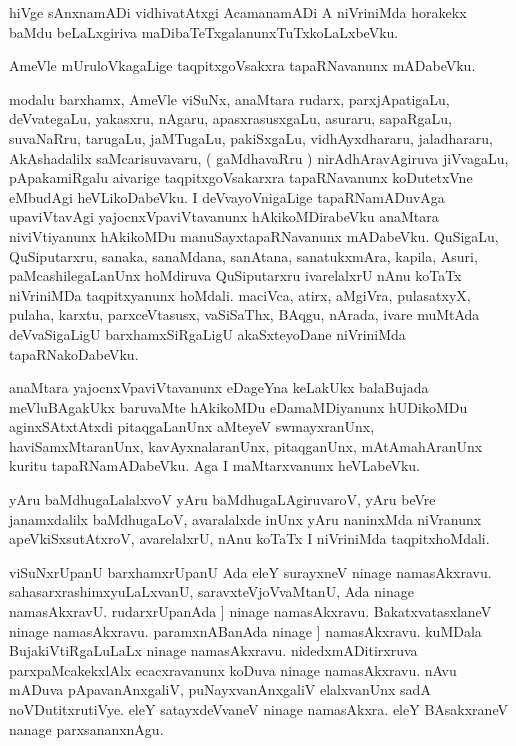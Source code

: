 \documentclass{article}
\begin{document}
\begin{mn}%
hiVge sAnxnamADi vidhivatAtxgi AcamanamADi A niVriniMda horakekx baMdu beLaLxgiriva 
maDibaTeTxgalanunxTuTxkoLaLxbeVku.
\end{mn}

\begin{mn}%
AmeVle mUruloVkagaLige taqpitxgoVsakxra tapaRNavanunx mADabeVku.
\end{mn}

\begin{mn}%
modalu barxhamx, AmeVle viSuNx, anaMtara rudarx, parxjApatigaLu, deVvategaLu, yakasxru, 
nAgaru, apasxrasusxgaLu, asuraru, sapaRgaLu, suvaNaRru, tarugaLu, jaMTugaLu, pakiSxgaLu, 
vidhAyxdhararu, jaladhararu, AkAshadalilx saMcarisuvavaru, ( gaMdhavaRru ) 
nirAdhAravAgiruva jiVvagaLu, pApakamiRgalu aivarige taqpitxgoVsakarxra tapaRNavanunx 
koDutetxVne eMbudAgi heVLikoDabeVku. I deVvayoVnigaLige tapaRNamADuvAga upaviVtavAgi 
yajocnxVpaviVtavanunx hAkikoMDirabeVku anaMtara niviVtiyanunx hAkikoMDu 
manuSayxtapaRNavanunx mADabeVku. QuSigaLu, QuSiputarxru, sanaka, sanaMdana, sanAtana, 
sanatukxmAra, kapila, Asuri, paMcashilegaLanUnx hoMdiruva QuSiputarxru ivarelalxrU nAnu 
koTaTx niVriniMDa taqpitxyanunx hoMdali. maciVca, atirx, aMgiVra, pulasatxyX, pulaha, 
karxtu, parxceVtasusx, vaSiSaThx, BAqgu, nArada, ivare muMtAda deVvaSigaLigU 
barxhamxSiRgaLigU akaSxteyoDane niVriniMda tapaRNakoDabeVku. 
\end{mn}

\begin{mn}%
anaMtara yajocnxVpaviVtavanunx eDageYna keLakUkx balaBujada meVluBAgakUkx baruvaMte 
hAkikoMDu eDamaMDiyanunx hUDikoMDu aginxSAtxtAtxdi pitaqgaLanUnx aMteyeV swmayxranUnx, 
haviSamxMtaranUnx, kavAyxnalaranUnx, pitaqganUnx, mAtAmahAranUnx kuritu tapaRNamADabeVku. 
Aga I maMtarxvanunx heVLabeVku.
\end{mn}

\begin{mn}%
yAru baMdhugaLalalxvoV yAru baMdhugaLAgiruvaroV, yAru beVre janamxdalilx baMdhugaLoV, 
avaralalxde inUnx yAru naninxMda niVranunx apeVkiSxsutAtxroV, avarelalxrU, nAnu koTaTx I 
niVriniMda taqpitxhoMdali.
\end{mn}

\begin{mn}%
viSuNxrUpanU barxhamxrUpanU Ada eleY surayxneV ninage namasAkxravu. 
sahasarxrashimxyuLaLxvanU, saravxteVjoVvaMtanU, Ada ninage namasAkxravU. rudarxrUpanAda ]
ninage namasAkxravu. BakatxvatasxlaneV ninage namasAkxravu. paramxnABanAda ninage ]
namasAkxravu. kuMDala BujakiVtiRgaLuLaLx ninage namasAkxravu. nidedxmADitirxruva 
parxpaMcakekxlAlx ecacxravanunx  koDuva ninage namasAkxravu. nAvu mADuva pApavanAnxgaliV, 
puNayxvanAnxgaliV elalxvanUnx sadA noVDutitxrutiVye. eleY satayxdeVvaneV ninage 
namasAkxra. eleY BAsakxraneV nanage parxsananxnAgu.
\end{mn}
\end{document}
